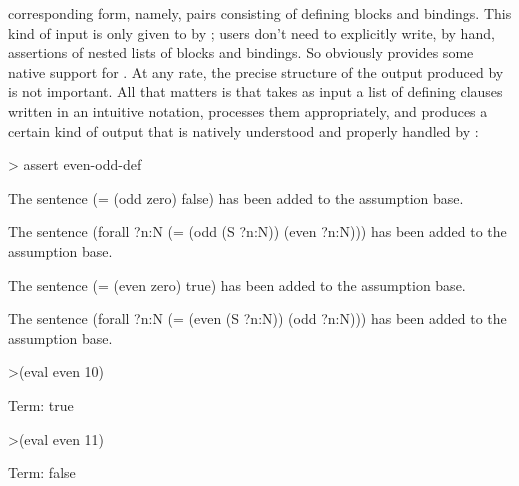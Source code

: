 corresponding form, namely, pairs consisting of defining blocks and
bindings. This kind of input is only given to  
by ; users don't need to explicitly write, by hand, 
assertions of nested lists of blocks and bindings. So 
obviously provides some native support for .  At any rate, 
the precise structure of the output produced by  is not 
important. All that matters is that  takes as input a 
list of defining clauses written in an intuitive notation, processes
them appropriately, and produces a certain kind of output that is
natively understood and properly handled by :
\begin{tcAthena}
> assert even-odd-def

The sentence 
(= (odd zero)
   false)
has been added to the assumption base.

The sentence 
(forall ?n:N
  (= (odd (S ?n:N))
     (even ?n:N)))
has been added to the assumption base.

The sentence 
(= (even zero)
   true)
has been added to the assumption base.

The sentence 
(forall ?n:N
  (= (even (S ?n:N))
     (odd ?n:N)))
has been added to the assumption base.

>(eval even 10)

Term: true

>(eval even 11)

Term: false
\end{tcAthena}

